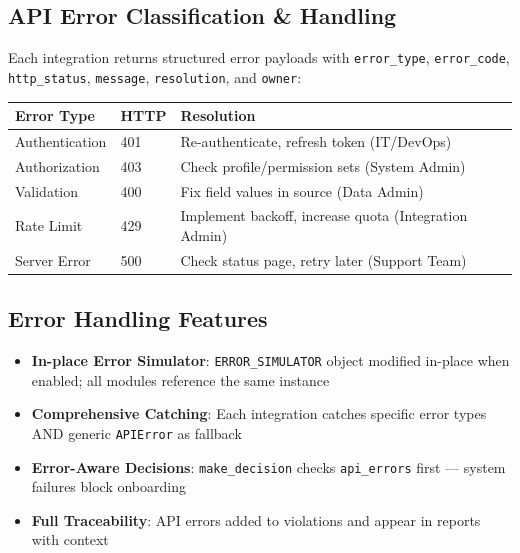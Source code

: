 \documentclass[8pt,a4paper]{article}
\begin{document}
\vspace{-0.2em}
\begin{minipage}[t]{0.48\textwidth}
\vspace{0pt}
\subsection{API Error Classification \& Handling}
{\scriptsize
Each integration returns structured error payloads with \texttt{error\_type}, \texttt{error\_code}, \texttt{http\_status}, \texttt{message}, \texttt{resolution}, and \texttt{owner}:
}

\vspace{0.05em}
\begin{table}[H]
\scriptsize
\begin{tabularx}{\textwidth}{@{}llX@{}}
\toprule
\textbf{Error Type} & \textbf{HTTP} & \textbf{Resolution} \\
\midrule
Authentication & 401 & Re-authenticate, refresh token (IT/DevOps) \\
Authorization & 403 & Check profile/permission sets (System Admin) \\
Validation & 400 & Fix field values in source (Data Admin) \\
Rate Limit & 429 & Implement backoff, increase quota (Integration Admin) \\
Server Error & 500 & Check status page, retry later (Support Team) \\
\bottomrule
\end{tabularx}
\end{table}
\end{minipage}
\hfill
\begin{minipage}[t]{0.48\textwidth}
\vspace{0pt}
\subsection{Error Handling Features}
{\scriptsize
\begin{itemize}[leftmargin=1.2em]
\item \textbf{In-place Error Simulator}: \texttt{ERROR\_SIMULATOR} object modified in-place when enabled; all modules reference the same instance
\item \textbf{Comprehensive Catching}: Each integration catches specific error types AND generic \texttt{APIError} as fallback
\item \textbf{Error-Aware Decisions}: \texttt{make\_decision} checks \texttt{api\_errors} first --- system failures block onboarding
\item \textbf{Full Traceability}: API errors added to violations and appear in reports with context
\end{itemize}
}
\end{minipage}
\end{document}
